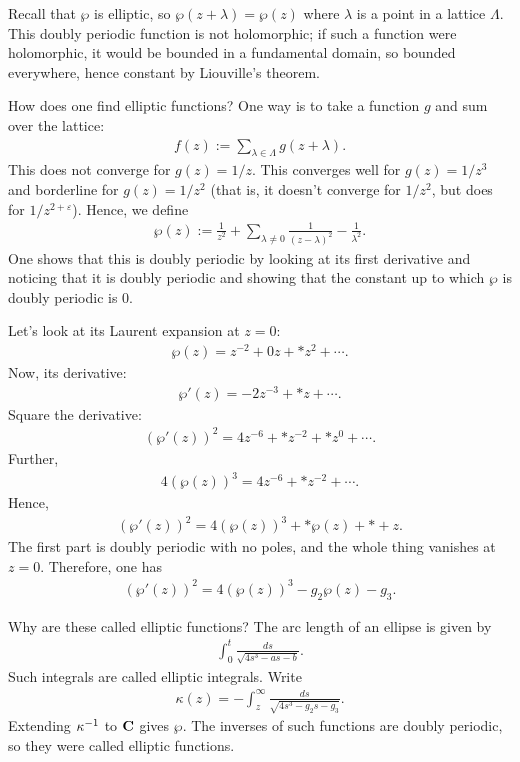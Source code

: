\documentclass [11 pt, oneside] {article}
\begin{document}
Recall that $\wp$ is elliptic, so $\wp(z+\lambda) = \wp(z)$ where $\lambda$ is a point in a lattice $\Lambda$. This doubly periodic function is not holomorphic; if such a function were holomorphic, it would be bounded in a fundamental domain, so bounded everywhere, hence constant by Liouville's theorem. 

How does one find elliptic functions? One way is to take a function $g$ and sum over the lattice:
\begin{align*}
	f(z) :=  \sum_{\lambda\in \Lambda}^{} g (z+\lambda).
\end{align*}
This does not converge for $g(z) = 1/z$. This converges well for $g(z) = 1/z^3$ and borderline for $g(z)=1/z^2$ (that is, it doesn't converge for $1/z^2$, but does for $1/z^{2+\varepsilon}$). Hence, we define
 \begin{align*}
	\wp(z) :=  \frac{1}{z^2} + \sum_{\lambda\ne 0}^{} \frac{1}{(z-\lambda)^2} - \frac{1}{\lambda^2}.
\end{align*}
One shows that this is doubly periodic by looking at its first derivative and noticing that it is doubly periodic and showing that the constant up to which $\wp$ is doubly periodic is $0$.

Let's look at its Laurent expansion at $z=0$:
\begin{align*}
	\wp(z) = z^{-2} + 0 z + *z^2 + \cdots.
\end{align*}
Now, its derivative:
\begin{align*}
	\wp'(z) = -2z^{-3} + *z +\cdots.
\end{align*}
Square the derivative:
\begin{align*}
	(\wp'(z)) ^2 = 4z^{-6} + *z^{-2} + *z^0 + \cdots.
\end{align*}
Further,
\begin{align*}
	4(\wp(z)) ^3 = 4z^{-6} + *z^{-2} + \cdots.
\end{align*}
Hence,
\begin{align*}
	(\wp'(z)) ^2 = 4(\wp(z)) ^3 +  *\wp(z) + * + z.
\end{align*}
The first part is doubly periodic with no poles, and the whole thing vanishes at $z=0$. Therefore, one has
\begin{align*}
	(\wp'(z)) ^2 = 4(\wp(z)) ^3 - g_2 \wp(z) -  g_3.
\end{align*}

Why are these called elliptic functions? The arc length of an ellipse is given by 
\begin{align*}
	\int_{0}^{t} \frac{ds}{\sqrt{4s^3 - as - b} }. 
\end{align*}
Such integrals are called elliptic integrals. Write
\begin{align*}
	\kappa(z) = -\int_{z}^{\infty} \frac{ds}{\sqrt{4s^3 -g_2s - g_3} }. 
\end{align*}
Extending $\kappa^{-1}$ to $\mathbf C$ gives $\wp$. The inverses of such functions are doubly periodic, so they were called elliptic functions.
\end{document}
